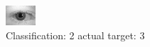 \begin{figure}[h!]
\begin{center}
\includegraphics[width=0.60\columnwidth]{figures/ID564_class_2_target_3.png}
\end{center}
\caption{ Classification: 2 actual target: 3}
\label{fig:ID564_class_2_target_3}
\end{figure}
